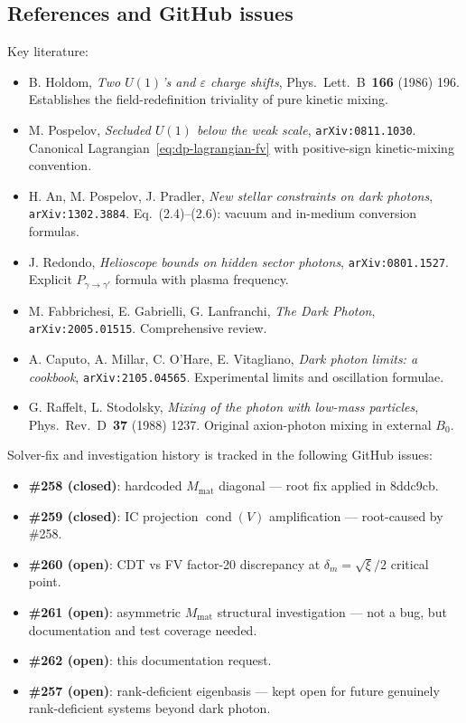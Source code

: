 \subsection{References and GitHub issues}
\label{subsec:dp-references}

Key literature:
\begin{itemize}
  \item B. Holdom, \textit{Two $U(1)$'s and $\varepsilon$ charge
        shifts}, Phys.\ Lett.\ B~\textbf{166} (1986) 196.
        Establishes the field-redefinition triviality of pure
        kinetic mixing.
  \item M. Pospelov, \textit{Secluded $U(1)$ below the weak scale},
        \texttt{arXiv:0811.1030}. Canonical
        Lagrangian~\eqref{eq:dp-lagrangian-fv} with
        positive-sign kinetic-mixing convention.
  \item H. An, M. Pospelov, J. Pradler, \textit{New stellar
        constraints on dark photons},
        \texttt{arXiv:1302.3884}. Eq.~(2.4)--(2.6): vacuum and
        in-medium conversion formulas.
  \item J. Redondo, \textit{Helioscope bounds on hidden sector
        photons}, \texttt{arXiv:0801.1527}.
        Explicit $P_{\gamma\to\gamma'}$ formula with plasma
        frequency.
  \item M. Fabbrichesi, E. Gabrielli, G. Lanfranchi,
        \textit{The Dark Photon}, \texttt{arXiv:2005.01515}.
        Comprehensive review.
  \item A. Caputo, A. Millar, C. O'Hare, E. Vitagliano,
        \textit{Dark photon limits: a cookbook},
        \texttt{arXiv:2105.04565}. Experimental limits and
        oscillation formulae.
  \item G. Raffelt, L. Stodolsky,
        \textit{Mixing of the photon with low-mass particles},
        Phys.\ Rev.\ D~\textbf{37} (1988) 1237.
        Original axion-photon mixing in external $B_0$.
\end{itemize}

Solver-fix and investigation history is tracked in the following
GitHub issues:

\begin{itemize}
  \item \textbf{\#258 (closed)}: hardcoded $M_{\mathrm{mat}}$
        diagonal --- root fix applied in 8ddc9cb.
  \item \textbf{\#259 (closed)}: IC projection $\operatorname{cond}(V)$
        amplification --- root-caused by \#258.
  \item \textbf{\#260 (open)}: CDT vs FV factor-20 discrepancy at
        $\delta_m = \sqrt{\xi}/2$ critical point.
  \item \textbf{\#261 (open)}: asymmetric $M_{\mathrm{mat}}$
        structural investigation --- not a bug, but documentation
        and test coverage needed.
  \item \textbf{\#262 (open)}: this documentation request.
  \item \textbf{\#257 (open)}: rank-deficient eigenbasis --- kept
        open for future genuinely rank-deficient systems beyond
        dark photon.
\end{itemize}

